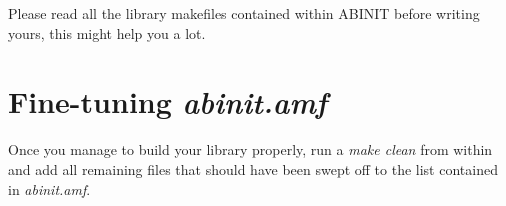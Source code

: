 Please read all the library makefiles contained within ABINIT before
writing yours, this might help you a lot.



\section{Fine-tuning \textit{abinit.amf}}

Once you manage to build your library properly, run a \textit{make clean} from
within and add all remaining files that should have been swept off to the
list contained in \textit{abinit.amf}.

